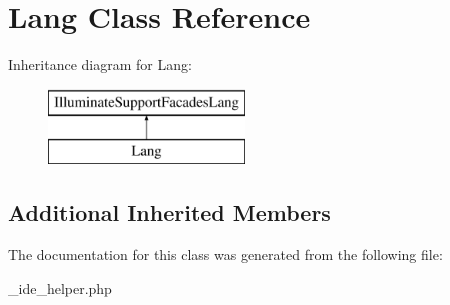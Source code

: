 \hypertarget{class_lang}{}\section{Lang Class Reference}
\label{class_lang}
Inheritance diagram for Lang\+:\begin{figure}[H]
\begin{center}
\leavevmode
\includegraphics[height=2.000000cm]{class_lang}
\end{center}
\end{figure}
\subsection*{Additional Inherited Members}


The documentation for this class was generated from the following file\+:\begin{DoxyCompactItemize}
\item 
\+\_\+ide\+\_\+helper.\+php\end{DoxyCompactItemize}
